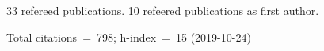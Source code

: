 33 refereed publications. 10 refeered publications as first author.

Total citations~=~798; h-index~=~15 (2019-10-24)